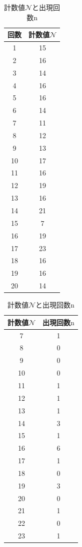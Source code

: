 \documentclass{jarticle}
\begin{document}
\begin{table}[H]
  \begin{minipage}[t]{0.45\textwidth}
    \centering
    \caption{自然計数の測定}
    \label{tb:natural-count}
    \small
    \begin{tabular}{cc}
      \hline
      回数 & 計数値$\mathcal{N}$ \\
      \hline
      1 & 15 \\
      2 & 16 \\
      3 & 14 \\
      4 & 16 \\
      5 & 16 \\
      6 & 14 \\
      7 & 11 \\
      8 & 12 \\
      9 & 13 \\
      10 & 17 \\
      11 & 16 \\
      12 & 19 \\
      13 & 16 \\
      14 & 21 \\
      15 & 7 \\
      16 & 19 \\
      17 & 23 \\
      18 & 16 \\
      19 & 16 \\
      20 & 14 \\
      \hline
    \end{tabular}
  \end{minipage}
  \begin{minipage}[t]{0.45\textwidth}
    \centering
    \caption{計数値$\mathcal{N}$と出現回数$\mathrm{n}$}
    \label{tb:count-distribution}
    \small
    \begin{tabular}{cc}
      \hline
      計数値$\mathcal{N}$ & 出現回数$\mathrm{n}$ \\
      \hline
      7 & 1 \\
      8 & 0 \\
      9 & 0 \\
      10 & 0 \\
      11 & 1 \\
      12 & 1 \\
      13 & 1 \\
      14 & 3 \\
      15 & 1 \\
      16 & 6 \\
      17 & 1 \\
      18 & 0 \\
      19 & 3 \\
      20 & 0 \\
      21 & 1 \\
      22 & 0 \\
      23 & 1 \\
      \hline
    \end{tabular}
  \end{minipage}
\end{table}
\end{document}
